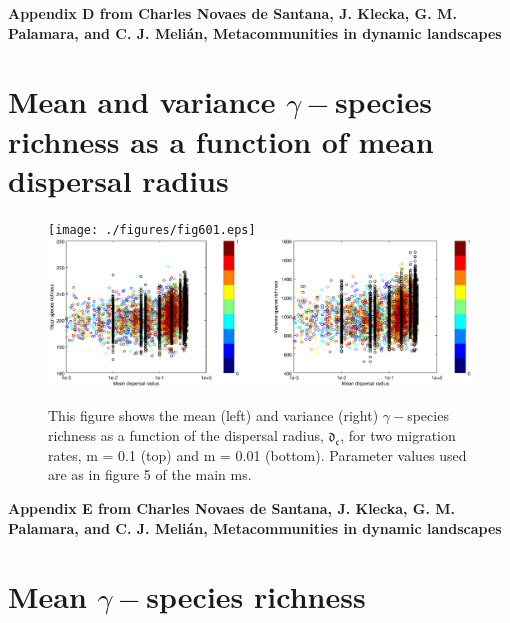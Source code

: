 \documentclass[12pt]{article}
\begin{document}
\clearpage
\begin{flushleft} 
{\Large \textbf{Appendix D from Charles Novaes de Santana, J. Klecka, G. M. Palamara, and C. J. Meli\'{a}n, Metacommunities in dynamic landscapes}}
\section*{Mean and variance $\gamma-$species richness as a function of mean dispersal radius}
\end{flushleft}
\renewcommand{\theequation}{D-\arabic{equation}}
\setcounter{equation}{0}
\renewcommand{\thesection}{D\arabic{section}}
\renewcommand{\thefigure}{D\arabic{figure}}
\renewcommand{\thetable}{D\arabic{table}}
\setcounter{figure}{0}
\setcounter{table}{0}

\begin{figure}[hb!]
\texttt{[image: ./figures/fig601.eps]}
\hspace{-2 in}\includegraphics[width=7in]{./figures/fig6001.eps}
\caption{This figure shows the mean (left) and variance (right) $\gamma-$species richness as a function of the dispersal radius, $\mathfrak{d_{c}}$, for two migration rates, m = 0.1 (top) and m = 0.01 (bottom). Parameter values used are as in figure 5 of the main ms.}
\label{fig:SI-D1}
\end{figure}

\clearpage
\begin{flushleft} 
{\Large \textbf{Appendix E from Charles Novaes de Santana, J. Klecka, G. M. Palamara, and C. J. Meli\'{a}n, Metacommunities in dynamic landscapes}}
\section*{Mean $\gamma-$species richness}
\end{flushleft}
\renewcommand{\theequation}{E-\arabic{equation}}
\setcounter{equation}{0}
\renewcommand{\thesection}{E\arabic{section}}
\renewcommand{\thefigure}{E\arabic{figure}}
\renewcommand{\thetable}{E\arabic{table}}
\setcounter{figure}{0}
\setcounter{table}{0}
\end{document}

